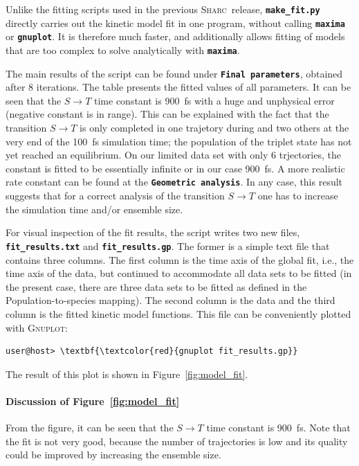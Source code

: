 \documentclass[a4paper,11pt,DIV=15,openany]{scrbook}
\newcommand{\sharc}{\textsc{Sharc}}
\newcommand{\ttt}[1]{\textbf{\texttt{#1}}}
\begin{document}
\normalsize

Unlike the fitting scripts used in the previous \sharc\ release, \ttt{make\_fit.py} directly carries out the kinetic model fit in one program, without calling \ttt{maxima} or \ttt{gnuplot}.
It is therefore much faster, and additionally allows fitting of models that are too complex to solve analytically with \ttt{maxima}.

The main results of the script can be found under \ttt{Final parameters}, obtained after 8 iterations.
The table presents the fitted values of all parameters.
It can be seen that the $S\rightarrow T$ time constant is 900~fs with a huge and unphysical error (negative constant is in range). 
This can be explained with the fact that the transition $S\rightarrow T$ is only completed in one trajetory during and two others at the very end of the 100~fs simulation time; the population of the triplet state has not yet reached an equilibrium.
On our limited data set with only 6 trjectories, the constant is fitted to be essentially infinite or in our case 900~fs. 
A more realistic rate constant can be found at the \ttt{Geometric analysis}. 
In any case, this result suggests that for a correct analysis of the transition $S\rightarrow T$ one has to increase the simulation time and/or ensemble size.

For visual inspection of the fit results, the script writes two new files, \ttt{fit\_results.txt} and \ttt{fit\_results.gp}.
The former is a simple text file that contains three columns.
The first column is the time axis of the global fit, i.e., the time axis of the data, but continued to accommodate all data sets to be fitted (in the present case, there are three data sets to be fitted as defined in the Population-to-species mapping).
The second column is the data and the third column is the fitted kinetic model functions.
This file can be conveniently plotted with \textsc{Gnuplot}:
\begin{Verbatim}[commandchars=\\\{\}]
user@host> \textbf{\textcolor{red}{gnuplot fit_results.gp}}
\end{Verbatim}
The result of this plot is shown in Figure~\ref{fig:model_fit}.


\paragraph{Discussion of Figure~\ref{fig:model_fit}}

From the figure, it can be seen that the $S\rightarrow T$ time constant is 900~fs.
Note that the fit is not very good, because the number of trajectories is low and its quality could be improved by increasing the ensemble size.
\end{document}
